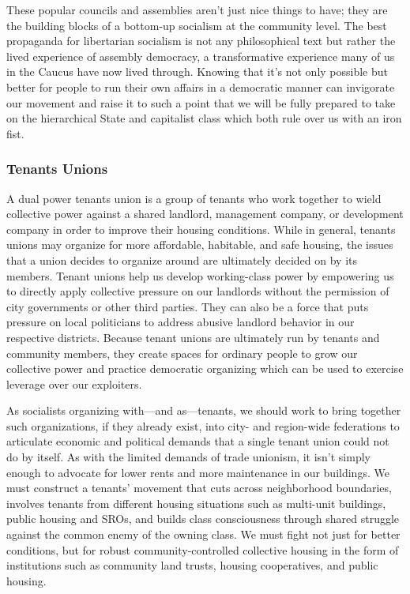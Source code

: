 \documentclass[10pt]{memoir}
\begin{document}
These popular councils and assemblies aren't just nice things to have;
they are the building blocks of a bottom-up socialism at the community
level. The best propaganda for libertarian socialism is not any
philosophical text but rather the lived experience of assembly
democracy, a transformative experience many of us in the Caucus have now
lived through. Knowing that it's not only possible but better for people
to run their own affairs in a democratic manner can invigorate our
movement and raise it to such a point that we will be fully prepared to
take on the hierarchical State and capitalist class which both rule over
us with an iron fist.

\subsubsection{Tenants Unions}\label{tenants-unions}

A dual power tenants union is a group of tenants who work together to
wield collective power against a shared landlord, management company, or
development company in order to improve their housing conditions. While
in general, tenants unions may organize for more affordable, habitable,
and safe housing, the issues that a union decides to organize around are
ultimately decided on by its members. Tenant unions help us develop
working-class power by empowering us to directly apply collective
pressure on our landlords without the permission of city governments or
other third parties. They can also be a force that puts pressure on
local politicians to address abusive landlord behavior in our respective
districts. Because tenant unions are ultimately run by tenants and
community members, they create spaces for ordinary people to grow our
collective power and practice democratic organizing which can be used to
exercise leverage over our exploiters.

As socialists organizing with---and as---tenants, we should work to
bring together such organizations, if they already exist, into city- and
region-wide federations to articulate economic and political demands
that a single tenant union could not do by itself. As with the limited
demands of trade unionism, it isn't simply enough to advocate for lower
rents and more maintenance in our buildings. We must construct a
tenants' movement that cuts across neighborhood boundaries, involves
tenants from different housing situations such as multi-unit buildings,
public housing and SROs, and builds class consciousness through shared
struggle against the common enemy of the owning class. We must fight not
just for better conditions, but for robust community-controlled
collective housing in the form of institutions such as community land
trusts, housing cooperatives, and public housing.
\end{document}
